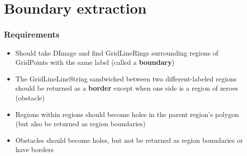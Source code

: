 \documentclass{beamer}
\begin{document}
\section{Boundary extraction}

\begin{frame}
    \frametitle{Requirements}
    \begin{itemize}
        \item Should take DImage and find GridLineRings surrounding regions of GridPoints with the same label (called a \textbf{boundary})
        \item The GridLineLineString sandwiched between two different-labeled regions should be returned as a \textbf{border} except when one side is a region of zeroes (obstacle)
        \item Regions within regions should become holes in the parent region's polygon (but also be returned as region boundaries)
        \item Obstacles should become holes, but not be returned as region boundaries or have borders
    \end{itemize}
\end{frame}
\end{document}
